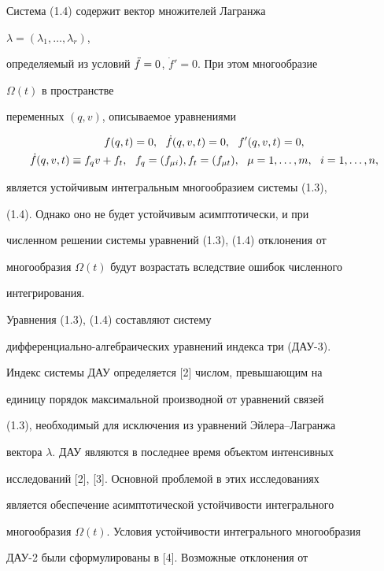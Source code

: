  


Система (1.4) содержит вектор множителей Лагранжа 


$\lambda=(\lambda_1,\dotsc,\lambda_r)$, 


определяемый из условий $\Ddot f=0$, $\Dot f'=0$. При этом многообразие 


$\Omega(t)$ в пространстве 


переменных $(q,v)$, описываемое уравнениями 


\begin{gather} 


f(q,t)=0,\ \ \Dot f(q,v,t)=0,\ \ f'(q,v,t)=0,\\ 


\Dot f(q,v,t)\equiv f_q v+f_t,\ \ f_q=(f_{\mu i}), 


f_t=(f_{\mu t}),\ \ \mu=1,\dotsc,m,\ \ i=1,\dotsc,n, \notag


\end{gather} 


является устойчивым интегральным многообразием системы (1.3), 


(1.4). Однако оно не будет устойчивым асимптотически, и при 


численном решении системы уравнений (1.3), (1.4) отклонения от 


многообразия $\Omega(t)$ будут возрастать вследствие ошибок численного 


интегрирования. 


 


Уравнения (1.3), (1.4) составляют систему 


дифференциально-алгебраических уравнений индекса три (ДАУ-3). 


Индекс системы ДАУ определяется [2] числом, превышающим на 


единицу порядок максимальной производной от уравнений связей 


(1.3), необходимый для исключения из уравнений Эйлера--Лагранжа 


вектора $\lambda$. ДАУ являются в последнее время объектом интенсивных 


исследований [2], [3]. Основной проблемой в этих исследованиях 


является обеспечение асимптотической устойчивости интегрального 


многообразия $\Omega(t)$. Условия устойчивости интегрального многообразия 


ДАУ-2 были сформулированы в [4]. Возможные отклонения от 


